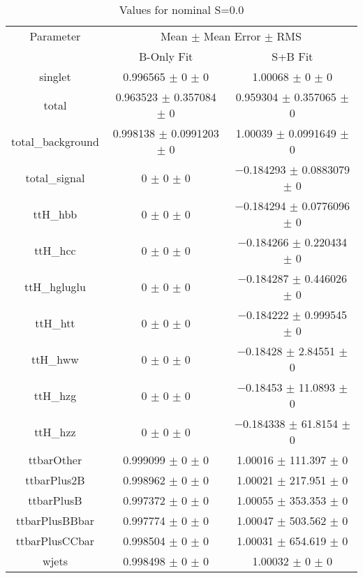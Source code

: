 \begin{table}
\centering
\caption{Values for nominal S=0.0}
\begin{tabular}{ccc}
\toprule
Parameter & \multicolumn{2}{c}{Mean $\pm$ Mean Error $\pm$ RMS}\\
 & B-Only Fit & S+B Fit\\
\midrule
singlet & \num{0.996565} $\pm$ \num{0} $\pm$ \num{0} & \num{1.00068} $\pm$ \num{0} $\pm$ \num{0}\\
total & \num{0.963523} $\pm$ \num{0.357084} $\pm$ \num{0} & \num{0.959304} $\pm$ \num{0.357065} $\pm$ \num{0}\\
total\_background & \num{0.998138} $\pm$ \num{0.0991203} $\pm$ \num{0} & \num{1.00039} $\pm$ \num{0.0991649} $\pm$ \num{0}\\
total\_signal & \num{0} $\pm$ \num{0} $\pm$ \num{0} & \num{-0.184293} $\pm$ \num{0.0883079} $\pm$ \num{0}\\
ttH\_hbb & \num{0} $\pm$ \num{0} $\pm$ \num{0} & \num{-0.184294} $\pm$ \num{0.0776096} $\pm$ \num{0}\\
ttH\_hcc & \num{0} $\pm$ \num{0} $\pm$ \num{0} & \num{-0.184266} $\pm$ \num{0.220434} $\pm$ \num{0}\\
ttH\_hgluglu & \num{0} $\pm$ \num{0} $\pm$ \num{0} & \num{-0.184287} $\pm$ \num{0.446026} $\pm$ \num{0}\\
ttH\_htt & \num{0} $\pm$ \num{0} $\pm$ \num{0} & \num{-0.184222} $\pm$ \num{0.999545} $\pm$ \num{0}\\
ttH\_hww & \num{0} $\pm$ \num{0} $\pm$ \num{0} & \num{-0.18428} $\pm$ \num{2.84551} $\pm$ \num{0}\\
ttH\_hzg & \num{0} $\pm$ \num{0} $\pm$ \num{0} & \num{-0.18453} $\pm$ \num{11.0893} $\pm$ \num{0}\\
ttH\_hzz & \num{0} $\pm$ \num{0} $\pm$ \num{0} & \num{-0.184338} $\pm$ \num{61.8154} $\pm$ \num{0}\\
ttbarOther & \num{0.999099} $\pm$ \num{0} $\pm$ \num{0} & \num{1.00016} $\pm$ \num{111.397} $\pm$ \num{0}\\
ttbarPlus2B & \num{0.998962} $\pm$ \num{0} $\pm$ \num{0} & \num{1.00021} $\pm$ \num{217.951} $\pm$ \num{0}\\
ttbarPlusB & \num{0.997372} $\pm$ \num{0} $\pm$ \num{0} & \num{1.00055} $\pm$ \num{353.353} $\pm$ \num{0}\\
ttbarPlusBBbar & \num{0.997774} $\pm$ \num{0} $\pm$ \num{0} & \num{1.00047} $\pm$ \num{503.562} $\pm$ \num{0}\\
ttbarPlusCCbar & \num{0.998504} $\pm$ \num{0} $\pm$ \num{0} & \num{1.00031} $\pm$ \num{654.619} $\pm$ \num{0}\\
wjets & \num{0.998498} $\pm$ \num{0} $\pm$ \num{0} & \num{1.00032} $\pm$ \num{0} $\pm$ \num{0}\\
\bottomrule
\end{tabular}
\end{table}